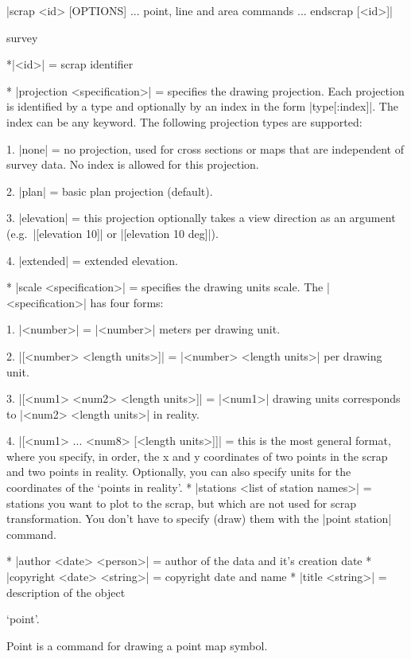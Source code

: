\syntax |scrap <id> [OPTIONS]
       ... point, line and area commands ...
       endscrap [<id>]|
\endsyntax

\context
  survey
\endcontext

\arguments
  *|<id>| = scrap identifier
\endarguments

\options
  * |projection <specification>| = specifies the drawing projection.
    Each projection is identified by a type and optionally by an index
    in the form |type[:index]|. The index can be any keyword. The following 
    projection types are supported:

    1. |none| = no projection, used for cross sections or maps that
       are independent of survey data. No index is allowed for this projection.

    2. |plan| = basic plan projection (default).

    3. |elevation| = this projection optionally takes a view direction
       as an argument (e.g.~|[elevation 10]| or |[elevation 10 deg]|).

    4. |extended| = extended elevation.

  * |scale <specification>| = specifies the drawing units scale.
    The |<specification>| has four forms:

    1. |<number>| = |<number>| meters per drawing unit.

    2. |[<number> <length units>]| = |<number> <length units>| per
       drawing unit.

    3. |[<num1> <num2> <length units>]| = |<num1>| drawing units 
       corresponds to |<num2> <length units>| in reality.

    4. |[<num1> ... <num8> [<length units>]]| = this is the most
       general format, where you specify, in order, the x and y coordinates
       of two points in the scrap and two points in reality.
       Optionally, you can also specify units for the coordinates of the `points in reality'.
  * |stations <list of station names>| = stations you want to plot
    to the scrap, but which are not used for scrap transformation. You don't have
    to specify (draw) them with the |point station| command.

  * |author <date> <person>| = author of the data and it's creation date
  * |copyright <date> <string>| = copyright date and name
  * |title <string>| = description of the object
\endoptions




\subsubchapter `point'.

\description
Point is a command for drawing a point map symbol.
\enddescription

